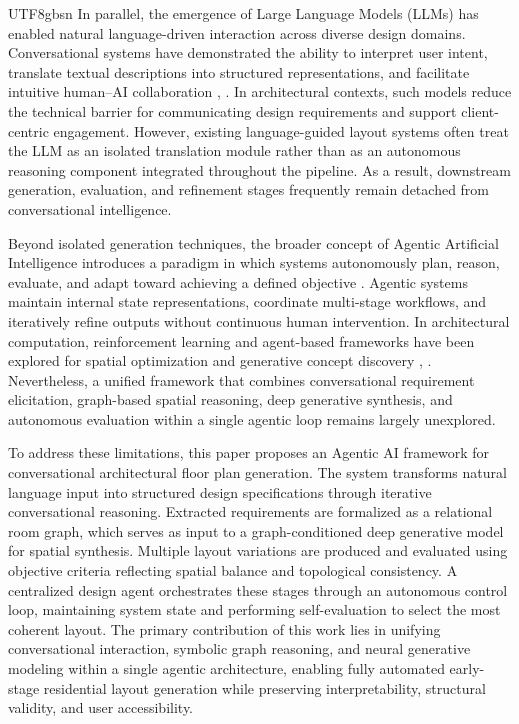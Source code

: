 \documentclass[11pt]{article}
\let\cite\citep
\providecommand\citep{\cite}
\begin{document}
\begin{CJK}{UTF8}{gbsn}
In parallel, the emergence of Large Language Models (LLMs) has enabled natural language-driven interaction across diverse design domains. Conversational systems have demonstrated the ability to interpret user intent, translate textual descriptions into structured representations, and facilitate intuitive human–AI collaboration \cite{b1}, \cite{b20}. In architectural contexts, such models reduce the technical barrier for communicating design requirements and support client-centric engagement. However, existing language-guided layout systems often treat the LLM as an isolated translation module rather than as an autonomous reasoning component integrated throughout the pipeline. As a result, downstream generation, evaluation, and refinement stages frequently remain detached from conversational intelligence.

Beyond isolated generation techniques, the broader concept of Agentic Artificial Intelligence introduces a paradigm in which systems autonomously plan, reason, evaluate, and adapt toward achieving a defined objective \cite{b21}. Agentic systems maintain internal state representations, coordinate multi-stage workflows, and iteratively refine outputs without continuous human intervention. In architectural computation, reinforcement learning and agent-based frameworks have been explored for spatial optimization and generative concept discovery \cite{b6}, \cite{b7}. Nevertheless, a unified framework that combines conversational requirement elicitation, graph-based spatial reasoning, deep generative synthesis, and autonomous evaluation within a single agentic loop remains largely unexplored.

To address these limitations, this paper proposes an Agentic AI framework for conversational architectural floor plan generation. The system transforms natural language input into structured design specifications through iterative conversational reasoning. Extracted requirements are formalized as a relational room graph, which serves as input to a graph-conditioned deep generative model for spatial synthesis. Multiple layout variations are produced and evaluated using objective criteria reflecting spatial balance and topological consistency. A centralized design agent orchestrates these stages through an autonomous control loop, maintaining system state and performing self-evaluation to select the most coherent layout. The primary contribution of this work lies in unifying conversational interaction, symbolic graph reasoning, and neural generative modeling within a single agentic architecture, enabling fully automated early-stage residential layout generation while preserving interpretability, structural validity, and user accessibility.



\end{CJK}
\end{document}
